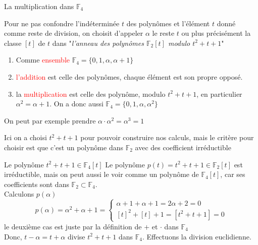 
\begin{parag}{La multiplication dans $\mathbb{F}_4$}
    
        Pour ne pas confondre l'indéterminée $t$ des polynômes et l'élément $t$ donné comme reste de division, on choisit d'appeler $\alpha$ le reste $t$ ou plus précisément la classe $[t]$ de $t$ dans "\textit{l'anneau des polynômes $\mathbb{F}_2[t]$ modulo $t^2 + t + 1$}"
        \begin{enumerate}
            \item Comme \textcolor{red}{ensemble} $\mathbb{F}_4 = \{0, 1, \alpha, \alpha + 1\}$
            \item \textcolor{red}{l'addition} est celle des polynômes, chaque élément est son propre opposé.
            \item la \textcolor{red}{multiplication} est celle des polynôme, modulo $t^2 + t + 1$, en particulier $\alpha^2 = \alpha + 1$. On a donc aussi $\mathbb{F}_4 = \{0, 1, \alpha, \alpha^2\}$   
        \end{enumerate}
        On peut par exemple prendre $\alpha \cdot \alpha^2 = \alpha^3 = 1$
        \begin{framedremark}
            Ici on a choisi $t^2 + t + 1$ pour pouvoir construire nos calculs, mais le critère pour choisir est que c'est un polynôme dans $\mathbb{F}_2$ avec des coefficient irréductible
        \end{framedremark}
        \begin{subparag}{Le polynôme $t^2 + t + 1 \in \mathbb{F}_4[t]$}
            Le polynôme $p(t) = t^2 + t + 1 \in \mathbb{F}_2[t]$ est irréductible, mais on peut aussi le voir comme un polynôme de $\mathbb{F}_4[t]$, car ses coefficients sont dans $\mathbb{F}_2 \subset \mathbb{F}_4$.
            \\
            Calculons $p(\alpha)$
            \[p(\alpha) = \alpha^2 + \alpha + 1 = \begin{cases}
                \alpha + 1  + \alpha + 1 = 2\alpha + 2  = 0\\
                [t]^2 + [t] + 1  = [t^2 + t + 1] = 0
            \end{cases}\]
            le deuxième cas est juste par la définition de $+$ et $\cdot $ dans $\mathbb{F}_4$\\
            Donc, $t-\alpha = t + \alpha$ divise $t^2 + t + 1$ dans $\mathbb{F}_4$. Effectuons la division euclidienne.
            

\end{subparag}
\end{parag}
